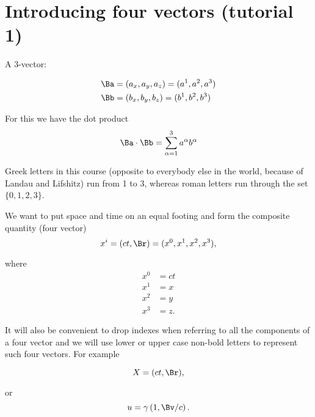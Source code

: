 %
%
\section{Introducing four vectors (tutorial 1)}

A 3-vector: 

\begin{align}\label{eqn:relativisticElectrodynamicsT1:10}
\Ba &= (a_x, a_y, a_z) = (a^1, a^2, a^3) \\
\Bb &= (b_x, b_y, b_z) = (b^1, b^2, b^3)
\end{align}

For this we have the dot product
\begin{equation}\label{eqn:relativisticElectrodynamicsT1:20}
\Ba \cdot \Bb = \sum_{\alpha=1}^3 a^\alpha b^\alpha
\end{equation}

Greek letters in this course (opposite to everybody else in the world, because of Landau and Lifshitz) run from 1 to 3, whereas roman letters run through the set $\{0,1,2,3\}$.

We want to put space and time on an equal footing and form the composite quantity (four vector) 
\begin{equation}\label{eqn:relativisticElectrodynamicsT1:40}
x^i = (ct, \Br) = (x^0, x^1, x^2, x^3),
\end{equation}

where
\begin{align}\label{eqn:relativisticElectrodynamicsT1:80}
x^0 &= ct \\
x^1 &= x \\
x^2 &= y \\
x^3 &= z.
\end{align}

It will also be convenient to drop indexes when referring to all the components of a four vector and we will use lower or upper case non-bold letters to represent such four vectors.  For example

\begin{equation}\label{eqn:relativisticElectrodynamicsT1:81}
X = (ct, \Br),
\end{equation}

or
\begin{equation}\label{eqn:relativisticElectrodynamicsT1:82}
u = \gamma \left(1, \Bv/c \right).
\end{equation}

